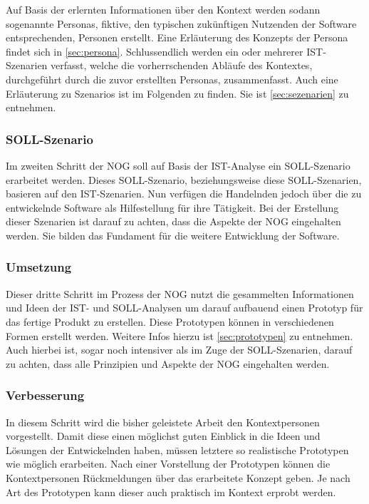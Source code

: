 Auf Basis der erlernten Informationen über den Kontext werden sodann sogenannte Personas, fiktive, den typischen zukünftigen Nutzenden der Software entsprechenden, Personen erstellt.
Eine Erläuterung des Konzepts der Persona findet sich in \autoref{sec:persona}.
Schlussendlich werden ein oder mehrerer IST-Szenarien verfasst, welche die vorherrschenden Abläufe des Kontextes, durchgeführt durch die zuvor erstellten Personas, zusammenfasst.
Auch eine Erläuterung zu Szenarios ist im Folgenden zu finden.
Sie ist \autoref{sec:sezenarien} zu entnehmen.

\subsubsection{SOLL-Szenario}

Im zweiten Schritt der NOG soll auf Basis der IST-Analyse ein SOLL-Szenario erarbeitet werden. 
Dieses SOLL-Szenario, beziehungsweise diese SOLL-Szenarien, basieren auf den IST-Szenarien.
Nun verfügen die Handelnden jedoch über die zu entwickelnde Software als Hilfestellung für ihre Tätigkeit.
Bei der Erstellung dieser Szenarien ist darauf zu achten, dass die Aspekte der NOG eingehalten werden.
Sie bilden das Fundament für die weitere Entwicklung der Software.

\subsubsection{Umsetzung}

Dieser dritte Schritt im Prozess der NOG nutzt die gesammelten Informationen und Ideen der IST- und SOLL-Analysen um darauf aufbauend einen Prototyp für das fertige Produkt zu erstellen.
Diese Prototypen können in verschiedenen Formen erstellt werden.
Weitere Infos hierzu ist \autoref{sec:prototypen} zu entnehmen.
Auch hierbei ist, sogar noch intensiver als im Zuge der SOLL-Szenarien, darauf zu achten, dass alle Prinzipien und Aspekte der NOG eingehalten werden.

\subsubsection{Verbesserung}

In diesem Schritt wird die bisher geleistete Arbeit den Kontextpersonen vorgestellt.
Damit diese einen möglichst guten Einblick in die Ideen und Lösungen der Entwickelnden haben, müssen letztere so realistische Prototypen wie möglich erarbeiten.
Nach einer Vorstellung der Prototypen können die Kontextpersonen Rückmeldungen über das erarbeitete Konzept geben.
Je nach Art des Prototypen kann dieser auch praktisch im Kontext erprobt werden.

